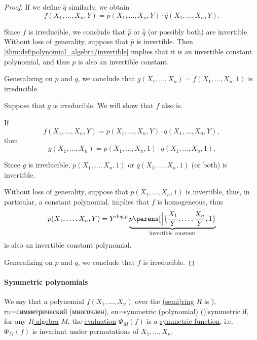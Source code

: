 \begin{proof}
  If we define \( \widehat{q} \) similarly, we obtain
  \begin{equation*}
    f(X_1, \ldots, X_n, Y) = \widehat p(X_1, \ldots, X_n, Y) \cdot \widehat q(X_1, \ldots, X_n, Y).
  \end{equation*}

  Since \( f \) is irreducible, we conclude that \( \widehat{p} \) or \( \widehat{q} \) (or possibly both) are invertible. Without loss of generality, suppose that \( \widehat{p} \) is invertible. Then \cref{thm:def:polynomial_algebra/invertible} implies that it is an invertible constant polynomial, and thus \( p \) is also an invertible constant.

  Generalizing on \( p \) and \( q \), we conclude that \( g(X_1, \ldots, X_n) = f(X_1, \ldots, X_n, 1) \) is irreducible.

  \NecessitySubProof Suppose that \( g \) is irreducible. We will show that \( f \) also is.

  If
  \begin{equation*}
    f(X_1, \ldots, X_n, Y) = p(X_1, \ldots, X_n, Y) \cdot q(X_1, \ldots, X_n, Y),
  \end{equation*}
  then
  \begin{equation*}
    g(X_1, \ldots, X_n) = p(X_1, \ldots, X_n, 1) \cdot q(X_1, \ldots, X_n, 1).
  \end{equation*}

  Since \( g \) is irreducible, \( p(X_1, \ldots, X_n, 1) \) or \( q(X_1, \ldots, X_n, 1) \) (or both) is invertible.

  Without loss of generality, suppose that \( p(X_1, \ldots, X_n, 1) \) is invertible, thus, in particular, a constant polynomial.  implies that \( f \) is homogeneous, thus
  \begin{equation*}
    p(X_1, \ldots, X_n, Y) = Y^{\deg p} \underbrace{p\parens[\Big]{ \frac {X_1} Y, \ldots, \frac {X_n} Y, 1 }}_{\T{invertible constant}}
  \end{equation*}
  is also an invertible constant polynomial.

  Generalizing on \( p \) and \( q \), we conclude that \( f \) is irreducible.
\end{proof}

\paragraph{Symmetric polynomials}

\begin{definition}\label{def:symmetric_polynomial}
  We say that a polynomial \( f(X_1, \ldots, X_n) \) over the \hyperref[def:semiring]{(semi)ring} \( R \) is \term[bg=симетричен (полином) (\cite[58]{ГеновМиховскиМоллов1991Алгебра}), ru=симметрический (многочлен), en=symmetric (polynomial) (\cite[190]{Lang2002Algebra})]{symmetric} if, for any \hyperref[def:algebra_over_semiring]{\( R \)-algebra} \( M \), the \hyperref[con:evaluation_homomorphism]{evaluation} \( \Phi_M(f) \) is a \hyperref[def:symmetric_function]{symmetric function}, i.e. \( \Phi_M(f) \) is invariant under permutations of \( X_1, \ldots, X_n \).
\end{definition}

